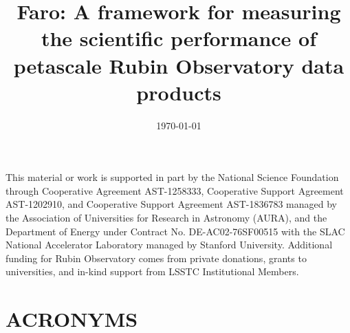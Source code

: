 \documentclass[]{spie}
\title{Faro: A framework for measuring the scientific performance of petascale Rubin Observatory data products}
\date{\today}
\def\acronyms{\section*{ACRONYMS}\label{sec:acronyms}}
\begin{document}
\maketitle





\appendix
%

\acknowledgments

This material or work is supported in part by the National Science Foundation through Cooperative Agreement AST-1258333, Cooperative Support Agreement AST-1202910, and Cooperative Support Agreement AST-1836783 managed by the Association of Universities for Research in Astronomy (AURA), and the Department of Energy under Contract No. DE-AC02-76SF00515 with the SLAC National Accelerator Laboratory managed by Stanford University.
Additional funding for Rubin Observatory comes from private donations, grants to universities, and in-kind support from LSSTC Institutional Members.




\acronyms 

\end{document}
